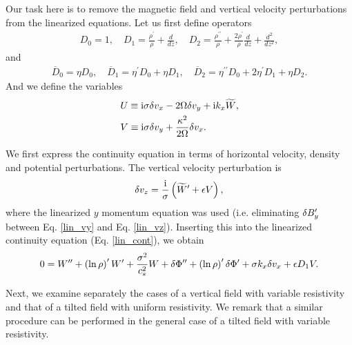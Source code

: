 Our task here is to remove the magnetic field and vertical velocity
perturbations from the linearized equations. Let us first define operators
\begin{align}
  D_0 = 1, \quad D_1 = \frac{\rho^\prime}{\rho} + \frac{d}{dz}, \quad
  D_2 = \frac{\rho^{\prime\prime}}{\rho} +
  \frac{2\rho^\prime}{\rho}\frac{d}{dz} + \frac{d^2}{d z^2},
\end{align}
and 
\begin{align}
  \overline{D}_0 = \eta D_0, \quad \overline{D}_1 = \eta^\prime D_0 + \eta
  D_1,\quad \overline{D}_2 = \eta^{\prime\prime} D_0 + 2\eta^\prime D_1 +
  \eta D_2. 
\end{align}
And we define the variables
\begin{align}
  &U \equiv \mathrm{i}\sigma\delta v_x - 2\Omega\delta v_y + \mathrm{i} k_x \widetilde{W},\\
  &V \equiv \mathrm{i}\sigma\delta v_y + \frac{\kappa^2}{2\Omega}\delta v_x.
\end{align}

We first express the continuity equation in terms of horizontal
velocity, density and potential perturbations. 
The vertical velocity perturbation is 
\begin{align}
  \delta v_z = \frac{\mathrm{i}}{\sigma}\left(\widetilde{W}^\prime + \epsilon V\right),  
\end{align}
where the linearized $y$ momentum equation was used (i.e. eliminating
$\delta B_y^\prime$ between Eq. \ref{lin_vy} and Eq. \ref{lin_vz}). 
Inserting this into the linearized continuity equation
(Eq. \ref{lin_cont}), we obtain
\begin{align}
0 = W^{\prime\prime} + \left(\ln{\rho}\right)^\prime W^\prime +
\frac{\sigma^2}{c_s^2}W +  \delta \Phi^{\prime\prime} + \left(\ln{\rho}\right)^\prime \delta \Phi^\prime
 + \sigma k_x \delta v_x + \epsilon D_1 V.
\end{align}

Next, we examine separately the cases of a vertical field with
variable resistivity and that of a tilted field with uniform
resistivity. We remark that a similar procedure can be performed in
the general case of a tilted field with variable resistivity. 


